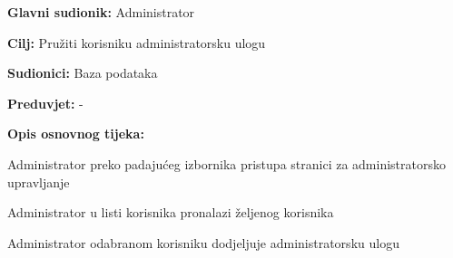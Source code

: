 					\noindent {}
					\begin{packed_item}
						
						\item \textbf{Glavni sudionik: } Administrator
						\item  \textbf{Cilj:} Pružiti korisniku administratorsku ulogu
						\item  \textbf{Sudionici:} Baza podataka
						\item  \textbf{Preduvjet:} -
						\item  \textbf{Opis osnovnog tijeka:}
						
						\item[] \begin{packed_enum}
							
							\item Administrator preko padajućeg izbornika pristupa stranici za administratorsko upravljanje
							\item Administrator u listi korisnika pronalazi željenog korisnika
							\item Administrator odabranom korisniku dodjeljuje administratorsku ulogu
							
						\end{packed_enum}
					\end{packed_item}	
					

